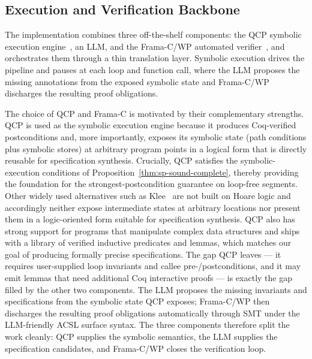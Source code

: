 \subsection{Execution and Verification Backbone}

The implementation combines three off-the-shelf components: the QCP symbolic execution engine~\cite{wu2025qcppracticalseparationlogicbased,vst-a}, an LLM, and the Frama-C/WP automated verifier~\cite{cuoq2012frama}, and orchestrates them through a thin translation layer. Symbolic execution drives the pipeline and pauses at each loop and function call, where the LLM proposes the missing annotations from the exposed symbolic state and Frama-C/WP discharges the resulting proof obligations.


The choice of QCP and Frama-C is motivated by their complementary strengths. QCP is used as the symbolic execution engine because it produces Coq-verified postconditions and, more importantly, exposes its symbolic state (path conditions plus symbolic stores) at arbitrary program points in a logical form that is directly reusable for specification synthesis. Crucially, QCP satisfies the symbolic-execution conditions of Proposition~\ref{thm:sp-sound-complete}, thereby providing the foundation for the strongest-postcondition guarantee on loop-free segments. Other widely used alternatives such as Klee~\cite{DBLP:conf/osdi/CadarDE08} are not built on Hoare logic and accordingly neither expose intermediate states at arbitrary locations nor present them in a logic-oriented form suitable for specification synthesis. QCP also has strong support for programs that manipulate complex data structures and ships with a library of verified inductive predicates and lemmas, which matches our goal of producing formally precise specifications. The gap QCP leaves --- it requires user-supplied loop invariants and callee pre-/postconditions, and it may emit lemmas that need additional Coq interactive proofs --- is exactly the gap filled by the other two components. The LLM proposes the missing invariants and specifications from the symbolic state QCP exposes; Frama-C/WP then discharges the resulting proof obligations automatically through SMT under the LLM-friendly ACSL surface syntax. The three components therefore split the work cleanly: QCP supplies the symbolic semantics, the LLM supplies the specification candidates, and Frama-C/WP closes the verification loop.

